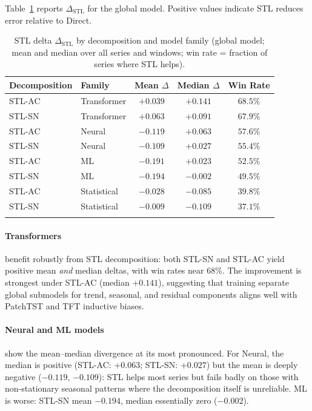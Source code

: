 \documentclass[pdflatex,sn-mathphys-num]{sn-jnl}
\theoremstyle{thmstyleone}
\theoremstyle{thmstyletwo}
\theoremstyle{thmstylethree}
\begin{document}
Table~\ref{tab:stl_delta} reports $\Delta_{\mathrm{STL}}$ for the global model.
Positive values indicate STL reduces error relative to Direct.

\begin{table}[ht]
\caption{STL delta $\Delta_{\mathrm{STL}}$ by decomposition and model family
(global model; mean and median over all series and windows;
win rate = fraction of series where STL helps).}\label{tab:stl_delta}
\begin{tabular*}{\textwidth}{@{\extracolsep\fill}llccc}
\toprule
Decomposition & Family & Mean $\Delta$ & Median $\Delta$ & Win Rate \\
\midrule
STL-AC & Transformer  & $+0.039$ & $+0.141$ & $68.5\%$ \\
STL-SN & Transformer  & $+0.063$ & $+0.091$ & $67.9\%$ \\
STL-AC & Neural       & $-0.119$ & $+0.063$ & $57.6\%$ \\
STL-SN & Neural       & $-0.109$ & $+0.027$ & $55.4\%$ \\
STL-AC & ML           & $-0.191$ & $+0.023$ & $52.5\%$ \\
STL-SN & ML           & $-0.194$ & $-0.002$ & $49.5\%$ \\
STL-AC & Statistical  & $-0.028$ & $-0.085$ & $39.8\%$ \\
STL-SN & Statistical  & $-0.009$ & $-0.109$ & $37.1\%$ \\
\botrule
\end{tabular*}
\end{table}

\paragraph{Transformers} benefit robustly from STL decomposition: both
STL-SN and STL-AC yield positive mean \emph{and} median deltas, with win
rates near 68\%.
The improvement is strongest under STL-AC (median $+0.141$), suggesting that
training separate global submodels for trend, seasonal, and residual components
aligns well with PatchTST and TFT inductive biases.

\paragraph{Neural and ML models} show the mean--median divergence at its
most pronounced.
For Neural, the median is positive (STL-AC: $+0.063$; STL-SN: $+0.027$) but
the mean is deeply negative ($-0.119$, $-0.109$): STL helps most series but
fails badly on those with non-stationary seasonal patterns where the
decomposition itself is unreliable.
ML is worse: STL-SN mean $-0.194$, median essentially zero ($-0.002$).
\end{document}
